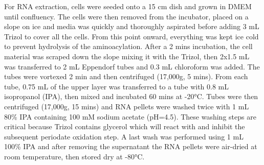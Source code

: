 \documentclass[9pt,lineno]{elife}
\begin{document}
For RNA extraction, cells were seeded onto a 15 cm dish and grown in DMEM until confluency.
The cells were then removed from the incubator, placed on a slope on ice and media was quickly and thoroughly aspirated before adding 3 mL Trizol to cover all the cells.
From this point onward, everything was kept ice cold to prevent hydrolysis of the aminoacylation.
After a 2 mins incubation, the cell material was scraped down the slope mixing it with the Trizol, then 2x1.5 mL was transferred to 2 mL Eppendorf tubes and 0.3 mL chloroform was added.
The tubes were vortexed 2 min and then centrifuged (17,000g, 5 mins).
From each tube, 0.75 mL of the upper layer was transferred to a tube with 0.8 mL isopropanol (IPA), then mixed and incubated 60 mins at -20°C.
Tubes were then centrifuged (17,000g, 15 mins) and RNA pellets were washed twice with 1 mL 80\% IPA containing 100 mM sodium acetate (pH=4.5).
These washing steps are critical because Trizol contains glycerol which will react with and inhibit the subsequent periodate oxidation step.
A last wash was performed using 1 mL 100\% IPA and after removing the supernatant the RNA pellets were air-dried at room temperature, then stored dry at -80°C.
\end{document}

